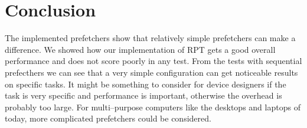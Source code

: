 \section{Conclusion} %


The implemented prefetchers show that relatively simple prefetchers
can make a difference. We showed how our implementation of RPT gets a
good overall performance and does not score poorly in any test. From
the tests with sequential prefecthers we can see that a very simple
configuration can get noticeable results on specific tasks. It might
be something to consider for device designers if the task is very
specific and performance is important, otherwise the overhead is
probably too large. For multi--purpose computers like the desktops and
laptops of today, more complicated prefetchers could be considered.
